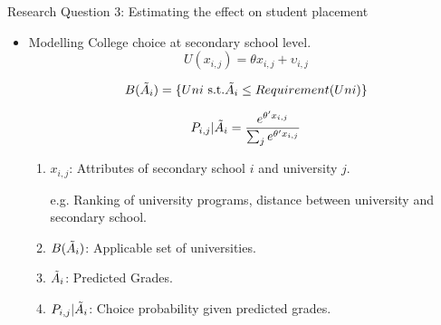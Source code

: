 \begin{frame}{Research Question 3: Estimating the effect on student placement}
    \begin{itemize}
        \item Modelling College choice at secondary school level.
        \begin{equation}
            U(x_{i,j}) = \theta x_{i,j}+\upsilon_{i,j}
        \end{equation}

        \begin{equation}
            B(\Tilde{A}_{i}) = \{Uni \ \text{s.t.} \Tilde{A_{i}}\leq Requirement(Uni)\}
        \end{equation}
        
        \begin{equation}
            P_{i,j}|\Tilde{A}_{i}=\frac{e^{\theta^{\prime} x_{i,j}}}{\sum_j e^{\theta^{\prime} x_{i,j}}}
        \end{equation}

        \begin{enumerate}
            \item $x_{i,j}$: Attributes of secondary school $i$ and university $j$.

            e.g. Ranking of university programs, distance between university and secondary school.

            \item $B(\Tilde{A}_{i})$: Applicable set of universities.

            \item $\Tilde{A}_{i}$: Predicted Grades.

            \item $P_{i,j}|\Tilde{A}_{i}$: Choice probability given predicted grades.
        \end{enumerate}
    \end{itemize}
\end{frame}

